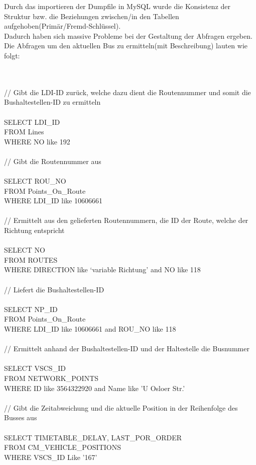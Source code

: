 \documentclass[a4paper, 12.5pt]{scrartcl}
\begin{document}
Durch das importieren der Dumpfile in MySQL wurde die Konsistenz der Struktur bzw. die Beziehungen zwischen/in den Tabellen aufgehoben(Primär/Fremd-Schlüssel).
\\
Dadurch haben sich massive Probleme bei der Gestaltung der Abfragen ergeben.\newline
\label{sec:jump}
\newline Die Abfragen um den aktuellen Bus zu ermitteln(mit Beschreibung) lauten wie folgt:

\begin{small}
\\ 
\\ // Gibt die LDI-ID zurück, welche dazu dient die Routennummer und somit die Bushaltestellen-ID zu ermitteln
\\ 
\\ SELECT LDI\_ID
\\ FROM Lines
\\ WHERE NO like 192
\\ 
\\ // Gibt die Routennummer aus
\\ 
\\ SELECT ROU\_NO
\\ FROM Points\_On\_Route
\\ WHERE LDI\_ID like 10606661 
\\ 
\\ // Ermittelt aus den gelieferten Routennummern, die ID der Route, welche der Richtung entspricht
\\ 
\\ SELECT NO
\\ FROM ROUTES
\\ WHERE DIRECTION like ‘variable Richtung’ and NO like 118
\\ 
\\ // Liefert die Bushaltestellen-ID
\\ 
\\ SELECT NP\_ID
\\ FROM Points\_On\_Route
\\ WHERE LDI\_ID like 10606661 and ROU\_NO like 118
\\ 
\\ // Ermittelt anhand der Bushaltestellen-ID und der Haltestelle die Busnummer
\\ 
\\ SELECT VSCS\_ID
\\ FROM NETWORK\_POINTS
\\ WHERE ID like 3564322920 and Name like 'U Osloer Str.'
\\ 
\\ // Gibt die Zeitabweichung und die aktuelle Position in der Reihenfolge des Busses aus
\\ 
\\ SELECT TIMETABLE\_DELAY, LAST\_POR\_ORDER
\\ FROM CM\_VEHICLE\_POSITIONS
\\ WHERE VSCS\_ID Like '167'
\end{small}
\end{document}
